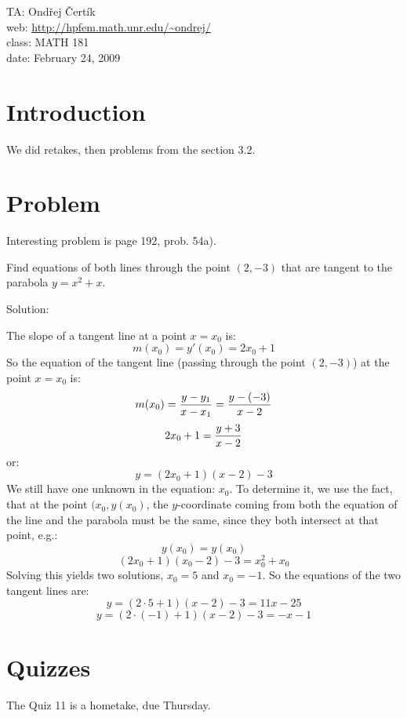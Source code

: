 \documentclass[10pt]{article}
\begin{document}
\noindent TA: Ondřej Čertík\\
web: \url{http://hpfem.math.unr.edu/~ondrej/}\\
class: MATH 181\\
date: February 24, 2009

\section{Introduction}

We did retakes, then problems from the section 3.2.

\section{Problem}

Interesting problem is page 192, prob. 54a).

Find equations of both lines through the point $(2, -3)$ that are tangent to
the parabola $y=x^2+x$.

Solution:

The slope of a tangent line at a point $x=x_0$ is:
$$m(x_0) = y'(x_0) = 2x_0+1$$
So the equation of the tangent line (passing through the point $(2, -3)$) at the point $x=x_0$ is:
$$m(x_0) = {y-y_1\over x-x_1} = {y-(-3)\over x-2}$$
$$2x_0 +1 = {y+3\over x-2}$$
or:
$$y = (2x_0+1)(x-2)-3$$
We still have one unknown in the equation: $x_0$. To determine it, we use the
fact, that at the point $(x_0, y(x_0)$, the $y$-coordinate coming from both the
equation of the line and the parabola must be the same, since they both
intersect at that point, e.g.:
$$y(x_0) = y(x_0)$$
$$(2x_0+1)(x_0-2)-3=x_0^2+x_0$$
Solving this yields two solutions, $x_0 = 5$ and $x_0 = -1$. So the equations
of the two tangent lines are:
$$y = (2\cdot 5+1)(x-2)-3 = 11x-25$$
$$y = (2\cdot (-1)+1)(x-2)-3 = -x-1$$

\section{Quizzes}

The Quiz 11 is a hometake, due Thursday.
\end{document}
